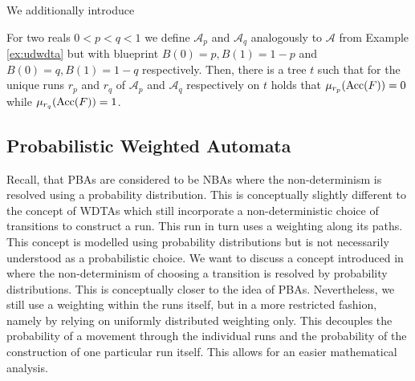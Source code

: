 We additionally introduce
\begin{proposition}
  \cite[Proposition 11]{RandAutoInfTrees}
  For two reals $0 < p < q < 1$ we define $\mathcal{A}_{p}$ and
  $\mathcal{A}_{q}$ analogously to $\mathcal{A}$ from Example \ref{ex:udwdta}
  but with blueprint $B(0) = p, B(1) = 1-p$ and $B(0) = q, B(1) = 1-q$
  respectively. Then, there is a tree $t$ such that for the unique runs $r_{p}$
  and $r_{q}$ of $\mathcal{A}_{p}$ and $\mathcal{A}_{q}$ respectively on
  $t$ holds that $\mu_{r_{p}}(\operatorname{Acc}(F)) = 0$ while $\mu_{r_{q}}(\operatorname{Acc}(F)) = 1$.
\end{proposition}

\subsection{Probabilistic Weighted Automata}
Recall, that \acp{PBA} are considered to be \acp{NBA} where the non-determinism
is resolved using a probability distribution. This is conceptually 
slightly different to the concept of \acp{WDTA} which still incorporate a 
non-deterministic choice of transitions to construct a run. This run in turn 
uses a weighting along its paths. This concept is modelled using probability 
distributions but is not necessarily understood as a probabilistic choice. We 
want to discuss a concept introduced in \cite[Chapter 4]{RandAutoInfTrees} 
where the non-determinism of choosing a transition is resolved by probability 
distributions. This is conceptually closer to the idea of \acp{PBA}. 
Nevertheless, we still use a weighting within the runs itself, but in a more 
restricted fashion, namely by relying on uniformly distributed weighting only. 
This decouples the probability of a movement through the individual runs and 
the probability of the construction of one particular run itself. This allows 
for an easier mathematical analysis.

